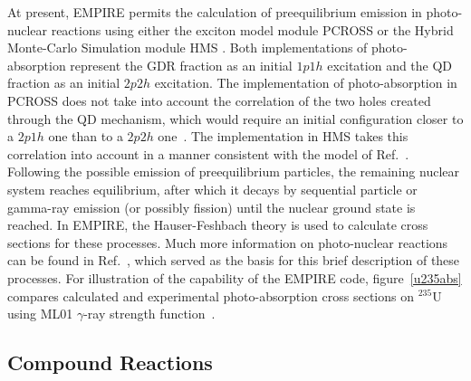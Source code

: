 At present, EMPIRE permits the calculation of preequilibrium emission in
photo-nuclear reactions using either the exciton model module PCROSS%
 or the Hybrid Monte-Carlo Simulation module HMS%
. Both implementations of photo-absorption represent the GDR
fraction as an initial $1p1h$ excitation and the QD fraction as an initial $%
2p2h$ excitation. The implementation of photo-absorption in PCROSS does not
take into account the correlation of the two holes created through the QD
mechanism, which would require an initial configuration closer to a $2p1h$
one than to a $2p2h$ one~\cite{PHNuc}. The implementation in HMS takes this
correlation into account in a manner consistent with the model of Ref.~\cite%
{chadQD}. Following the possible emission of preequilibrium particles, the
remaining nuclear system reaches equilibrium, after which it decays by
sequential particle or gamma-ray emission (or possibly fission) until the
nuclear ground state is reached. In EMPIRE, the Hauser-Feshbach theory is
used to calculate cross sections for these processes. Much more information
on photo-nuclear reactions can be found in Ref.~\cite{PHNuc}, which served
as the basis for this brief description of these processes. For illustration
of the capability of the EMPIRE code, figure~\ref{u235abs} compares
calculated and experimental photo-absorption cross sections on $^{235}$U
using ML01 $\gamma$-ray strength function~\cite{mike2}.


\subsection{Compound Reactions}

